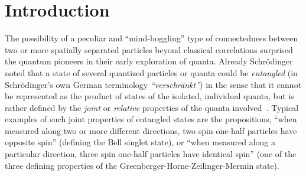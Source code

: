 \documentclass[fleqn,twoside]{article}      %
\begin{document}
\setcounter{page}{1}%
\maketitl                 %
%







\section{Introduction}

The possibility of a peculiar and ``mind-boggling'' type of connectedness
between two or more spatially separated particles beyond classical correlations
surprised the quantum pioneers in their early exploration of quanta.
Already Schr\"odinger~\cite{schrodinger,CambridgeJournals:1737068,CambridgeJournals:2027212}
noted that a state of several quantized particles or quanta
could be {\em entangled} (in Schr\"odinger's own German terminology {\em ``verschr\"ankt''})
in the sense that it cannot be represented as the product of states of the isolated, individual quanta,
but is rather defined by the {\em joint} or {\em relative} properties of the quanta involved~\cite{zeil-99,zeil-Zuk-bruk-01}.
Typical examples of such joint properties of entangled states are the propositions,
``when measured along two or more different directions, two spin one-half particles have opposite spin''
(defining the Bell singlet state),
or ``when measured along a particular direction, three spin one-half particles have identical spin''
(one of the three defining properties of the Greenberger-Horne-Zeilinger-Mermin state).
\end{document}
